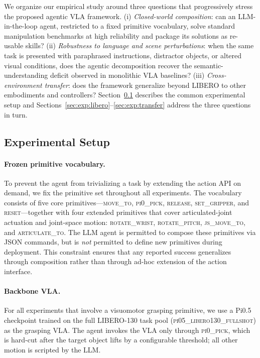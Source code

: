 \documentclass{article}
\begin{document}
We organize our empirical study around three questions that progressively
stress the proposed agentic VLA framework. (i) \emph{Closed-world
composition}: can an LLM-in-the-loop agent, restricted to a fixed primitive
vocabulary, solve standard manipulation benchmarks at high reliability and
package its solutions as re-usable skills? (ii) \emph{Robustness to language
and scene perturbations}: when the same task is presented with paraphrased
instructions, distractor objects, or altered visual conditions, does the
agentic decomposition recover the semantic-understanding deficit observed in
monolithic VLA baselines? (iii) \emph{Cross-environment transfer}: does the
framework generalize beyond LIBERO to other embodiments and controllers?
Section~\ref{sec:exp:setup} describes the common experimental setup and
Sections~\ref{sec:exp:libero}--\ref{sec:exp:transfer} address the three
questions in turn.

\subsection{Experimental Setup}
\label{sec:exp:setup}

	\paragraph{Frozen primitive vocabulary.} To prevent the agent from
	trivializing a task by extending the action API on demand, we fix the
	primitive set throughout all experiments. The vocabulary consists of
	five core primitives---\textsc{move\_to}, \textsc{pi0\_pick},
	\textsc{release}, \textsc{set\_gripper}, and \textsc{reset}---together
	with four extended primitives that cover articulated-joint actuation
	and joint-space motion:
	\textsc{rotate\_wrist}, \textsc{rotate\_pitch},
	\textsc{js\_move\_to}, and \textsc{articulate\_to}.
	The LLM agent is permitted to compose these primitives via JSON
	commands, but is \emph{not} permitted to define new primitives during
	deployment. This constraint ensures that any reported success
	generalizes through composition rather than through ad-hoc extension
	of the action interface.

	\paragraph{Backbone VLA.} For all experiments that involve a
	visuomotor grasping primitive, we use a Pi0.5 checkpoint trained on
	the full LIBERO-130 task pool (\textsc{pi05\_libero130\_fullshot})
	as the grasping VLA. The agent invokes the VLA only through
	\textsc{pi0\_pick}, which is hard-cut after the target object lifts
	by a configurable threshold; all other motion is scripted by the
	LLM.
\end{document}
